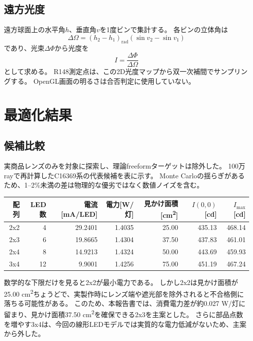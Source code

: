 \documentclass[11pt,a4paper]{article}
\begin{document}
\subsection{遠方光度}
遠方球面上の水平角$h$、垂直角$v$を1度ビンで集計する。
各ビンの立体角は
\[
\Delta\Omega
= (h_2-h_1)_\mathrm{rad}
\left(\sin v_2-\sin v_1\right)
\]
であり、光束$\Delta\Phi$から光度を
\[
I = \frac{\Delta\Phi}{\Delta\Omega}
\]
として求める。
R148測定点は、この2D光度マップから双一次補間でサンプリングする。
OpenGL画面の明るさは合否判定に使用していない。

\section{最適化結果}
\subsection{候補比較}
実商品レンズのみを対象に探索し、理論freeformターゲットは除外した。
100万rayで再計算したC16369系の代表候補を表に示す。
Monte Carloの揺らぎがあるため、1--2\%未満の差は物理的な優劣ではなく数値ノイズを含む。

\begin{longtable}{rrrrrrr}
\toprule
配列 & LED数 & 電流[mA/LED] & 電力[W/灯] & 見かけ面積[cm\textsuperscript{2}] & $I(0,0)$[cd] & $I_\mathrm{max}$[cd] \\
\midrule
2x2 & 4 & 29.2401 & 1.4035 & 25.00 & 435.13 & 468.14 \\
2x3 & 6 & 19.8665 & 1.4304 & 37.50 & 437.83 & 461.01 \\
2x4 & 8 & 14.9213 & 1.4324 & 50.00 & 443.69 & 459.93 \\
3x4 & 12 & 9.9001 & 1.4256 & 75.00 & 451.19 & 467.24 \\
\bottomrule
\end{longtable}

数学的な下限だけを見ると2x2が最小電力である。
しかし2x2は見かけ面積が25.00 cm\textsuperscript{2}ちょうどで、実製作時にレンズ端や遮光部を除外されると不合格側に落ちる可能性がある。
このため、本報告書では、消費電力差が約0.027 W/灯に留まり、見かけ面積37.50 cm\textsuperscript{2}を確保できる2x3を主案とした。
さらに部品点数を増やす3x4は、今回の線形LEDモデルでは実質的な電力低減がないため、主案から外した。
\end{document}
